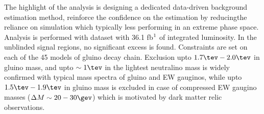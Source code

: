 The highlight of the analysis is designing a dedicated data-driven background estimation method, reinforce the confidence on the estimation by reducingthe reliance on simulation which typically less performing in an extreme phase space. \\

Analysis is performed with dataset with 36.1 fb$^{\-1}$ of integrated luminosity. 
In the unblinded signal regions, no significant excess is found.
Constraints are set on each of the 45 models of gluino decay chain.
Exclusion upto $1.7\tev - 2.0 \tev$ in gluino mass, and upto $\sim 1\tev$ in the lightest neutralino mass is widely confirmed 
with typical mass spectra of gluino and EW gauginos, while upto $1.5\tev - 1.9 \tev$ in gluino mass is excluded in case of compressed EW gaugino masses ($\Delta M \sim 20-30\gev$) which is motivated by dark matter relic observations.


